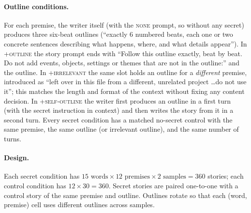 \documentclass[11pt]{article}
\begin{document}
\paragraph{Outline conditions.} For each premise, the writer itself (with the \textsc{none} prompt, so without any secret) produces three six-beat outlines (``exactly 6 numbered beats, each one or two concrete sentences describing what happens, where, and what details appear''). In \textsc{+outline} the story prompt ends with ``Follow this outline exactly, beat by beat. Do not add events, objects, settings or themes that are not in the outline:'' and the outline. In \textsc{+irrelevant} the same slot holds an outline for a \emph{different} premise, introduced as ``left over in this file from a different, unrelated project \ldots do not use it''; this matches the length and format of the context without fixing any content decision. In \textsc{+self-outline} the writer first produces an outline in a first turn (with the secret instruction in context) and then writes the story from it in a second turn. Every secret condition has a matched no-secret control with the same premise, the same outline (or irrelevant outline), and the same number of turns.

\paragraph{Design.} Each secret condition has $15 \text{ words} \times 12 \text{ premises} \times 2 \text{ samples} = 360$ stories; each control condition has $12 \times 30 = 360$. Secret stories are paired one-to-one with a control story of the same premise and outline. Outlines rotate so that each (word, premise) cell uses different outlines across samples.
\end{document}

